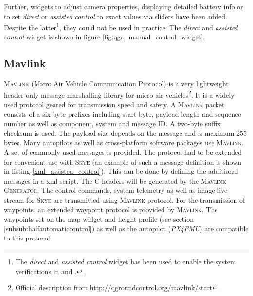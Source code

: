 
Further, widgets to adjust camera properties, displaying detailed battery info or to set \textit{direct} or \textit{assisted control} to exact values via sliders have been added. Despite the latter\footnote{The \textit{direct} and \textit{assisted control} widget has been used to enable the system verifications in \cite{meiermueri} and \cite{weichart}.}, they could not be used in practice. The \textit{direct} and \textit{assisted control} widget is shown in figure \ref{fig:qgc_manual_control_widget}.

\subsection{Mavlink}
\label{subsec:mavlink}
\textsc{Mavlink} (Micro Air Vehicle Communication Protocol) is a very lightweight header-only message marshalling library for micro air vehicles\footnote{Official description from \url{http://qgroundcontrol.org/mavlink/start}}. It is a widely used protocol geared for transmission speed and safety. A \textsc{Mavlink} packet consists of a six byte prefixes including start byte, payload length and sequence number as well as component, system and message ID. A two-byte suffix checksum is used. The payload size depends on the message and is maximum 255 bytes. Many autopilots as well as cross-platform software packages use \textsc{Mavlink}.
A set of commonly used messages is provided. The protocol had to be extended for convenient use with \textsc{Skye} (an example
 of such a message definition is shown in listing \ref{xml_assisted_control}). This can be done by defining the additional messages in a xml script. The C-headers will be generated by the \textsc{Mavlink Generator}. The control commands, system telemetry as well as image live stream for \textsc{Skye} are transmitted using \textsc{Mavlink} protocol. For the transmission of waypoints, an extended waypoint protocol is provided by \textsc{Mavlink}. The waypoints set on the map widget and height profile (see section \ref{subsub:halfautomaticcontrol}) as well as the autopilot (\textit{PX4FMU}) are compatible to this protocol.

